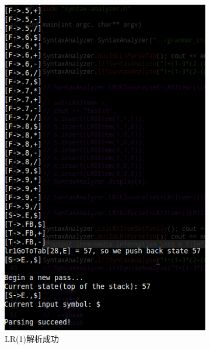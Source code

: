 \documentclass{article}
\begin{document}
\begin{CJK*}{UTF8}{gbsn}
\begin{figure}
        \centering        
        \begin{subfigure}[b]{0.5\textwidth}
                \includegraphics[width=\textwidth]{lr1yes.png}
                \caption{LR(1)解析成功}
                \label{fig:lr1yes}
        \end{subfigure}        
        \begin{subfigure}[b]{0.4\textwidth}

\end{subfigure}
\end{figure}
\end{CJK*}
\end{document}
